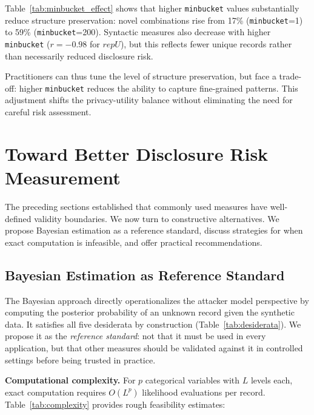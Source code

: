\documentclass[Afour,sageh,times,doublespace]{sagej}
\begin{document}
Table~\ref{tab:minbucket_effect} shows that higher \texttt{minbucket} values substantially reduce structure preservation: novel combinations rise from 17\% (\texttt{minbucket}=1) to 59\% (\texttt{minbucket}=200). Syntactic measures also decrease with higher \texttt{minbucket} ($r = -0.98$ for $repU$), but this reflects fewer unique records rather than necessarily reduced disclosure risk.

Practitioners can thus tune the level of structure preservation, but face a trade-off: higher \texttt{minbucket} reduces the ability to capture fine-grained patterns. This adjustment shifts the privacy-utility balance without eliminating the need for careful risk assessment.



\section{Toward Better Disclosure Risk Measurement}
\label{sec:better}

The preceding sections established that commonly used measures have well-defined validity boundaries. We now turn to constructive alternatives. We propose Bayesian estimation as a reference standard, discuss strategies for when exact computation is infeasible, and offer practical recommendations.

\subsection{Bayesian Estimation as Reference Standard}

The Bayesian approach \citep{reiter2014} directly operationalizes the attacker model perspective by computing the posterior probability of an unknown record given the synthetic data. It satisfies all five desiderata by construction (Table~\ref{tab:desiderata}). We propose it as the \textit{reference standard}: not that it must be used in every application, but that other measures should be validated against it in controlled settings before being trusted in practice.

\textbf{Computational complexity.} For $p$ categorical variables with $L$ levels each, exact computation requires $O(L^p)$ likelihood evaluations per record. Table~\ref{tab:complexity} provides rough feasibility estimates:
\end{document}
